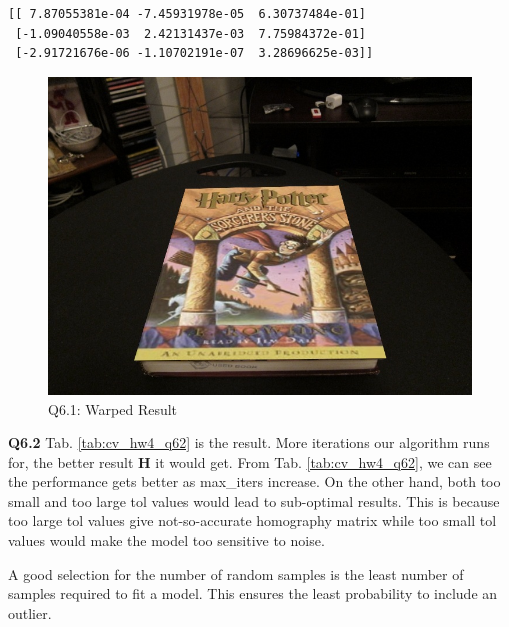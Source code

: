 \documentclass[
  course = {{16-720B Computer Vision}},
  quartile = {{1}},
  assignment = 4\ -\ Feature\ Descriptors\ \&\ Homographies\ \& \  RANSAC,
  name = {{Kangle Deng}},
  email = {{kangled@andrew.cmu.edu}},
  firstexercise = 1
]{aga-homework}
\begin{document}
\begin{verbatim}
[[ 7.87055381e-04 -7.45931978e-05  6.30737484e-01]
 [-1.09040558e-03  2.42131437e-03  7.75984372e-01]
 [-2.91721676e-06 -1.10702191e-07  3.28696625e-03]]
\end{verbatim}

\begin{figure}
    \centering
    \includegraphics[width=.6\textwidth]{CV/fig/hw4/6_1.jpg}
    \caption{Q6.1: Warped Result}
    \label{fig:cv_hw4_q61}
\end{figure}

\noindent \textbf{Q6.2} Tab. \ref{tab:cv_hw4_q62} is the result. More iterations our algorithm runs for, the better result $\mathbf{H}$ it would get. From Tab. \ref{tab:cv_hw4_q62}, we can see the performance gets better as max\_iters increase. On the other hand, both too small and too large tol values would lead to sub-optimal results. This is because too large tol values give not-so-accurate homography matrix while too small tol values would make the model too sensitive to noise.

A good selection for the number of random samples is the least number of samples required to fit a model. This ensures the least probability to include an outlier.
\end{document}

